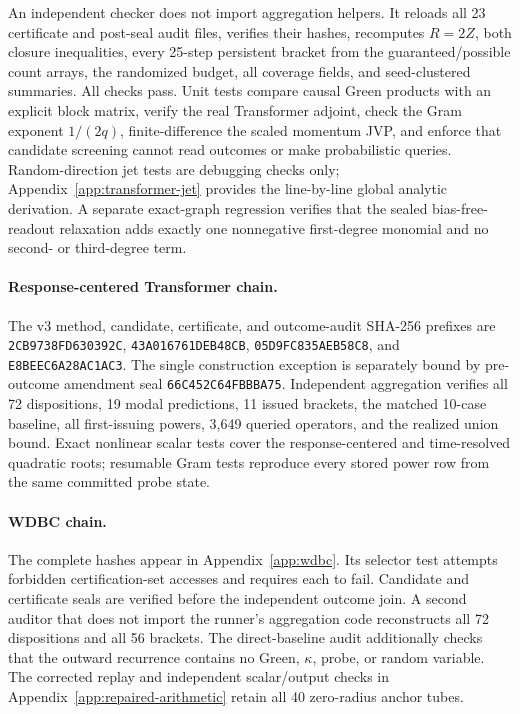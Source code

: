 \documentclass{article}
\begin{document}
An independent checker does not import aggregation helpers.  It reloads all 23
certificate and post-seal audit files, verifies their hashes, recomputes
$R=2Z$, both closure inequalities, every 25-step persistent bracket from the
guaranteed/possible count arrays, the randomized budget, all coverage fields,
and seed-clustered summaries.  All checks pass.  Unit tests compare causal
Green products with an explicit block matrix, verify the real Transformer
adjoint, check the Gram exponent $1/(2q)$, finite-difference the scaled momentum
JVP, and enforce that candidate screening cannot read outcomes or make
probabilistic queries.  Random-direction jet tests are debugging checks only;
Appendix~\ref{app:transformer-jet} provides the line-by-line global analytic
derivation.  A separate exact-graph regression verifies that the sealed
bias-free-readout relaxation adds exactly one nonnegative first-degree
monomial and no second- or third-degree term.

\paragraph{Response-centered Transformer chain.}
The v3 method, candidate, certificate, and outcome-audit SHA-256 prefixes are
\texttt{2CB9738FD630392C}, \texttt{43A016761DEB48CB},
\texttt{05D9FC835AEB58C8}, and \texttt{E8BEEC6A28AC1AC3}.  The single
construction exception is separately bound by pre-outcome amendment seal
\texttt{66C452C64FBBBA75}.  Independent aggregation verifies all 72
dispositions, 19 modal predictions, 11 issued brackets, the matched 10-case
baseline, all first-issuing powers, 3,649 queried operators, and the realized
union bound.  Exact nonlinear scalar tests cover the response-centered and
time-resolved quadratic roots; resumable Gram tests reproduce every stored
power row from the same committed probe state.

\paragraph{WDBC chain.}
The complete hashes appear in Appendix~\ref{app:wdbc}.  Its selector test
attempts forbidden certification-set accesses and requires each to fail.
Candidate and certificate seals are verified before the independent outcome
join.  A second auditor that does not import the runner's aggregation code
reconstructs all 72 dispositions and all 56 brackets.  The direct-baseline
audit additionally checks that the outward recurrence contains no Green,
$\kappa$, probe, or random variable.  The corrected replay and independent
scalar/output checks in Appendix~\ref{app:repaired-arithmetic} retain all
40 zero-radius anchor tubes.
\end{document}
